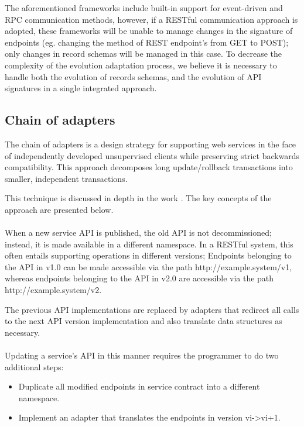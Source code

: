 The aforementioned frameworks include built-in support for event-driven and RPC communication methods,
however, if a RESTful communication approach is adopted, these frameworks will be unable to manage changes in the signature of endpoints
(eg. changing the method of REST endpoint's from GET to POST); only changes in record schemas will be managed in this case.
To decrease the complexity of the evolution adaptation process, we believe it is necessary to handle both the evolution of records schemas, and the evolution of API signatures in a single integrated approach.

\subsection{Chain of adapters} %
\label{sec:chain_of_adapters}

The chain of adapters is a design strategy for supporting web services in the face of independently developed unsupervised clients while preserving strict backwards compatibility.
This approach decomposes long update/rollback transactions into smaller, independent transactions.

This technique is discussed in depth in the work \cite{13}. The key concepts of the approach are presented below.

\paragraph{}

When a new service API is published, the old API is not decommissioned;
instead, it is made available in a different namespace.
In a RESTful system, this often entails supporting operations in different versions;
Endpoints belonging to the API in v1.0 can be made accessible via the path http://example.system/v1,
whereas endpoints belonging to the API in v2.0 are accessible via the path http://example.system/v2.

The previous API implementations are replaced by adapters that redirect all calls to the next API version implementation and also translate data structures as necessary.

\paragraph{}

Updating a service's API in this manner requires the programmer to do two additional steps:
\begin{itemize}
    \item Duplicate all modified endpoints in service contract into a different namespace.
    \item Implement an adapter that translates the endpoints in version vi->vi+1.
\end{itemize}

